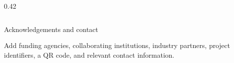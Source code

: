 \documentclass[final]{beamer}
\begin{document}
\begin{frame}[t]
\begin{columns}[t,totalwidth=\textwidth]
\begin{column}{0.42\textwidth}
    \end{column}

\end{columns}

\vspace{0.35cm}

\begin{block}{Acknowledgements and contact}
    \justifying

    Add funding agencies, collaborating institutions, industry
    partners, project identifiers, a QR code, and relevant contact
    information.
\end{block}

\end{frame}
\end{document}

